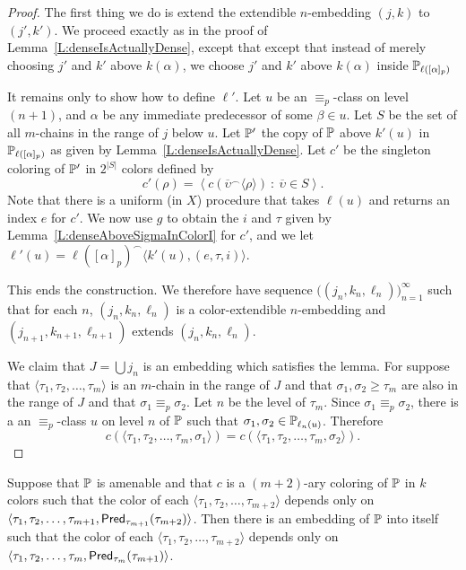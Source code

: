 \begin{proof}
The first thing we do is
extend the extendible $n$-embedding $(j,k)$ to $(j',k')$.
We proceed exactly as in the proof of Lemma~\ref{L:denseIsActuallyDense},
except that except that instead of merely choosing $j'$ and $k'$
above $k(\alpha)$, we choose $j'$ and $k'$ above $k(\alpha)$
inside $\mathbb{P}_{\ell([\alpha]_p)}$

It remains only to show how to define $\ell'$.
Let $u$ be an $\equiv_p$-class on level $(n+1)$,
and $\alpha$ be any immediate predecessor of some $\beta\in u$.
Let $S$ be the set of all $m$-chains in the range of $j$ below $u$.
Let $\mathbb{P}'$ the copy of $\mathbb{P}$ above $k'(u)$ in $\mathbb{P}_{\ell([\alpha]_p)}$ as given by Lemma~\ref{L:denseIsActuallyDense}.
Let $c'$ be the singleton coloring of $\mathbb{P}'$ in $2^{|S|}$ colors
defined by
$$c'(\rho)=\left\langle c(\overline{\upsilon}^\frown\langle\rho\rangle)\ :\ \overline{\upsilon}\in S\right\rangle.$$
Note that there is a uniform (in $X$) procedure that takes
$\ell(u)$ and returns an index $e$ for $c'$.
We now use $g$ to obtain the $i$ and $\tau$ given by Lemma~\ref{L:denseAboveSigmaInColorI} for $c'$,
and we let $\ell'(u)=\ell([\alpha]_p)^\frown\langle k'(u),(e,\tau,i)\rangle$.

This ends the construction.
We therefore have sequence $\big((j_n,k_n,\ell_n)\big)_{n=1}^\infty$
such that for each $n$, $(j_n,k_n,\ell_n)$ is a color-extendible $n$-embedding
and $(j_{n+1},k_{n+1},\ell_{n+1})$ extends $(j_n,k_n,\ell_n)$.

We claim that $J=\bigcup j_n$ is an embedding which satisfies the lemma.
For suppose that $\langle\tau_1,\tau_2,\ldots,\tau_m\rangle$ is an $m$-chain
in the range of $J$ and that $\sigma_1,\sigma_2\geq\tau_m$ are also in the
range of $J$ and that $\sigma_1\equiv_p\sigma_2$.
Let $n$ be the level of $\tau_m$.
Since $\sigma_1\equiv_p\sigma_2$, there is a an $\equiv_p$-class
$u$ on level $n$ of $\mathbb{P}$ such that $\sigma_1,\sigma_2\in\mathbb{P}_{\ell_n(u)}$.
Therefore
$$c(\langle\tau_1,\tau_2,\ldots,\tau_m,\sigma_1\rangle)=c(\langle\tau_1,\tau_2,\ldots,\tau_m,\sigma_2\rangle).$$
\end{proof}

\begin{lem}[ACA$_0$]\label{lem:useGraphInduced}
Suppose that $\mathbb{P}$ is amenable and that $c$ is a $(m+2)$-ary coloring of $\mathbb{P}$ in $k$ colors
such that the color of each $\langle \tau_1,\tau_2,\ldots,\tau_{m+2}\rangle$ depends only on
$\langle \tau_1,\tau_2,\ldots,\tau_{m+1},\mathsf{Pred}_{\tau_{m+1}}(\tau_{m+2})\rangle$.
Then there is an embedding of $\mathbb{P}$ into itself such that the color of each
$\langle \tau_1,\tau_2,\ldots,\tau_{m+2}\rangle$ depends only on
$\langle \tau_1,\tau_2,\ldots,\tau_{m},\mathsf{Pred}_{\tau_{m}}(\tau_{m+1})\rangle$.
\end{lem}

